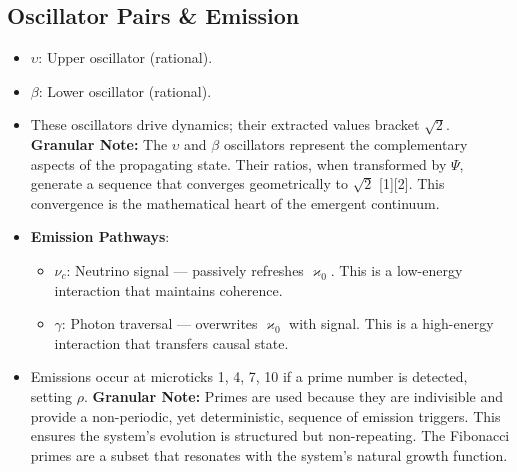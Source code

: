 \documentclass[12pt]{article}
\begin{document}
\subsection{Oscillator Pairs \& Emission}
\begin{itemize}
    \item $\upsilon$: Upper oscillator (rational).
    \item $\beta$: Lower oscillator (rational).
    \item These oscillators drive dynamics; their extracted values bracket $\sqrt{2}$.
    \textbf{Granular Note:} The $\upsilon$ and $\beta$ oscillators represent the complementary aspects of the propagating state. Their ratios, when transformed by $\Psi$, generate a sequence that converges geometrically to $\sqrt{2}$ [1][2]. This convergence is the mathematical heart of the emergent continuum.
    \item \textbf{Emission Pathways}:
        \begin{itemize}
            \item $\nu_c$: Neutrino signal — passively refreshes $\varkappa_0$. This is a low-energy interaction that maintains coherence.
            \item $\gamma$: Photon traversal — overwrites $\varkappa_0$ with signal. This is a high-energy interaction that transfers causal state.
        \end{itemize}
    \item Emissions occur at microticks 1, 4, 7, 10 if a prime number is detected, setting $\rho$.
    \textbf{Granular Note:} Primes are used because they are indivisible and provide a non-periodic, yet deterministic, sequence of emission triggers. This ensures the system's evolution is structured but non-repeating. The Fibonacci primes are a subset that resonates with the system's natural growth function.
\end{itemize}
\end{document}
